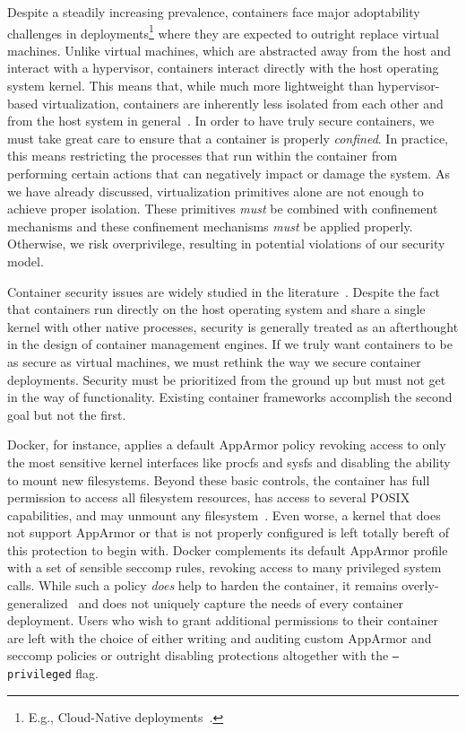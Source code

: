 Despite a steadily increasing prevalence, containers face major adoptability challenges in
deployments\footnote{E.g., Cloud-Native deployments~\cite{brady2020_docker_cloud}.} where
they are expected to outright replace virtual machines. Unlike virtual machines, which are
abstracted away from the host and interact with a hypervisor, containers interact directly
with the host operating system kernel. This means that, while much more lightweight than
hypervisor-based virtualization, containers are inherently less isolated from each other
and from the host system in general~\cite{sultan2019_container_security,
lin2018_container_security, mullinix2020_security_measures, bui2015_docker_analysis}.  In
order to have truly secure containers, we must take great care to ensure that a container
is properly \textit{confined}. In practice, this means restricting the processes that run
within the container from performing certain actions that can negatively impact or damage
the system.  As we have already discussed, virtualization primitives alone are not enough
to achieve proper isolation. These primitives \textit{must} be combined with confinement
mechanisms and these confinement mechanisms \textit{must} be applied properly. Otherwise,
we risk overprivilege, resulting in potential violations of our security model.

Container security issues are widely studied in the
literature~\cite{sultan2019_container_security, lin2018_container_security,
mp2016_hardening, mullinix2020_security_measures, bui2015_docker_analysis}.  Despite the
fact that containers run directly on the host operating system and share a single kernel
with other native processes, security is generally treated as an afterthought in the
design of container management engines. If we truly want containers to be as secure as
virtual machines, we must rethink the way we secure container deployments. Security must
be prioritized from the ground up but must not get in the way of functionality. Existing
container frameworks accomplish the second goal but not the first.

Docker, for instance, applies a default AppArmor policy revoking access to only the most
sensitive kernel interfaces like procfs and sysfs and disabling the ability to mount new
filesystems. Beyond these basic controls, the container has full permission to access all
filesystem resources, has access to several POSIX capabilities, and may unmount any
filesystem~\cite{docker_apparmor, docker_default_apparmor}. Even worse, a kernel that does
not support AppArmor or that is not properly configured is left totally bereft of this
protection to begin with. Docker complements its default AppArmor profile with a set of
sensible seccomp rules, revoking access to many privileged system calls. While such
a policy \textit{does} help to harden the container, it remains
overly-generalized~\cite{sultan2019_container_security} and does not uniquely capture the
needs of every container deployment. Users who wish to grant additional permissions to
their container are left with the choice of either writing and auditing custom AppArmor
and seccomp policies or outright disabling protections altogether with the
\texttt{--privileged} flag.

